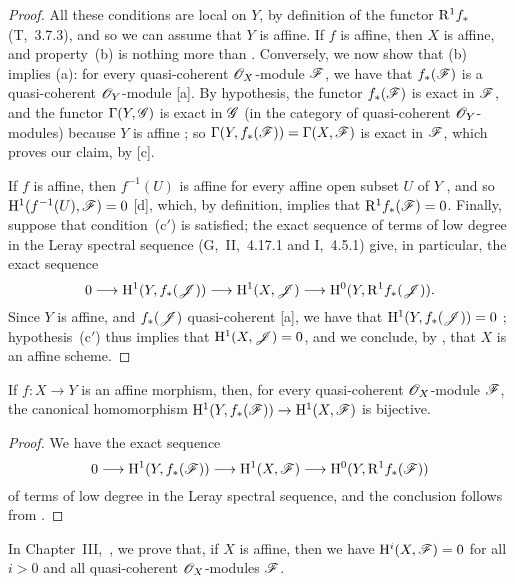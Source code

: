 \begin{proof}
\label{proof-II.5.2.2}
All these conditions are local on $Y$, by definition of the functor $\mathrm{R}^1 f_*$ (T,~3.7.3), and so we can assume that $Y$ is affine.
If $f$ is affine, then $X$ is affine, and property~(b) is nothing more than .
Conversely, we now show that (b) implies (a):
for every quasi-coherent $\mathscr{O}_X$-module $\mathscr{F}$, we have that $f_*(\mathscr{F})$ is a quasi-coherent $\mathscr{O}_Y$-module [a].
By hypothesis, the functor $f_*(\mathscr{F})$ is exact in $\mathscr{F}$, and the functor $\Gamma(Y,\mathscr{G})$ is exact in $\mathscr{G}$ (in the category of quasi-coherent $\mathscr{O}_Y$-modules) because $Y$ is affine ;
so $\Gamma(Y,f_*(\mathscr{F}))=\Gamma(X,\mathscr{F})$ is exact in $\mathscr{F}$, which proves our claim, by [c].

If $f$ is affine, then $f^{-1}(U)$ is affine for every affine open subset $U$ of $Y$ , and so $\mathrm{H}^1(f^{-1}(U),\mathscr{F})=0$ [d], which, by definition, implies that $\mathrm{R}^1 f_*(\mathscr{F})=0$.
Finally, suppose that condition~(c$'$) is satisfied;
the exact sequence of terms of low degree in the Leray spectral sequence (G,~II,~4.17.1 and I,~4.5.1) give, in particular, the exact sequence
\[
  0\to\HH^1(Y,f_*(\sh{J}))\to\HH^1(X,\sh{J})\to\HH^0(Y,\RR^1 f_*(\sh{J})).
\]
Since $Y$ is affine, and $f_*(\mathscr{J})$ quasi-coherent [a], we have that $\mathrm{H}^1(Y,f_*(\mathscr{J}))=0$ ;
hypothesis~(c$'$) thus implies that $\mathrm{H}^1(X,\mathscr{J})=0$, and we conclude, by , that $X$ is an affine scheme.
\end{proof}

\begin{corollary}[5.2.3]
\label{II.5.2.3}
If $f:X\to Y$ is an affine morphism, then, for every quasi-coherent $\mathscr{O}_X$-module $\mathscr{F}$, the canonical homomorphism $\HH^1(Y,f_*(\sh{F}))\to\HH^1(X,\sh{F})$ is bijective.
\end{corollary}

\begin{proof}
\label{proof-II.5.2.3}
We have the exact sequence
\[
  0\to\HH^1(Y,f_*(\sh{F}))\to\HH^1(X,\sh{F})\to\HH^0(Y,\RR^1 f_*(\sh{F}))
\]
of terms of low degree in the Leray spectral sequence, and the conclusion follows from .
\end{proof}

\begin{remark}[5.2.4]
\label{II.5.2.4}
In Chapter~III,~, we prove that, if $X$ is affine, then we have $\mathrm{H}^i(X,\mathscr{F})=0$ for all $i>0$ and all quasi-coherent $\mathscr{O}_X$-modules $\mathscr{F}$.
\end{remark}

